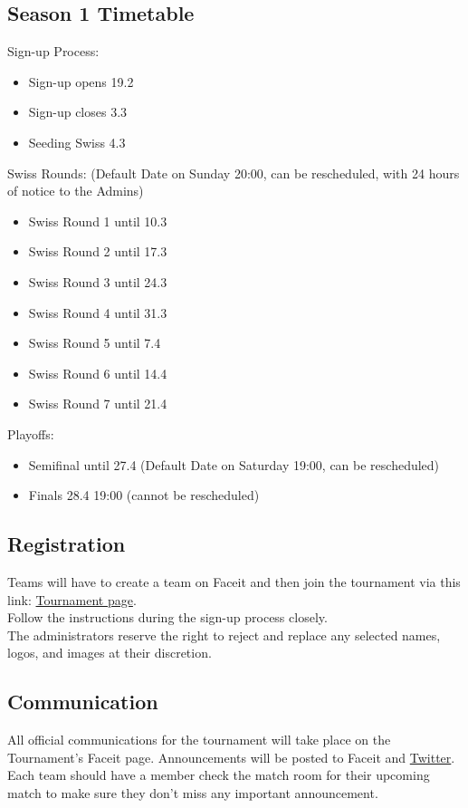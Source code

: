 \documentclass{article}
\def\twitter{\href{https://twitter.com/chcsleague}{Twitter}}
\begin{document}
\subsection{Season 1 Timetable}
Sign-up Process:
\begin{itemize}
\item Sign-up opens 19.2
\item Sign-up closes 3.3
\item Seeding Swiss 4.3
\end{itemize}
Swiss Rounds: (Default Date on Sunday 20:00, can be rescheduled, with 24 hours of notice to the Admins)
\begin{itemize}
\item Swiss Round 1 until 10.3
\item Swiss Round 2 until 17.3
\item Swiss Round 3 until 24.3
\item Swiss Round 4 until 31.3
\item Swiss Round 5 until 7.4
\item Swiss Round 6 until 14.4
\item Swiss Round 7 until 21.4
\end{itemize}
Playoffs:
\begin{itemize}
\item Semifinal until 27.4 (Default Date on Saturday 19:00, can be rescheduled)
\item Finals 28.4 19:00 (cannot be rescheduled)
\end{itemize}

\subsection{Registration}
Teams will have to create a team on Faceit and then join the tournament via this link: \href{www.google.com}{Tournament page}.\\
Follow the instructions during the sign-up process closely.\\
The administrators reserve the right to reject and replace any selected names, logos, and images at their discretion. 

\subsection{Communication}
All official communications for the tournament will take place on the Tournament's Faceit page. Announcements will be posted to Faceit and \twitter. Each team should have a member check the match room for their upcoming match to make sure they don't miss any important announcement. 
\end{document}
